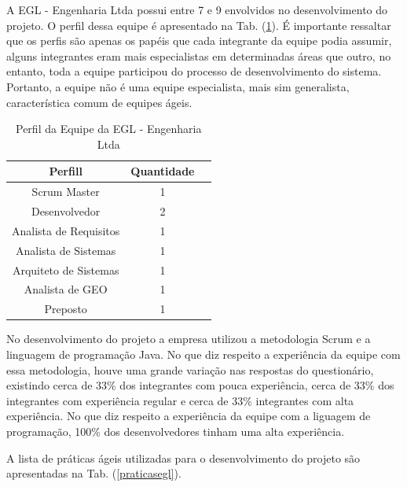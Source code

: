 A EGL - Engenharia Ltda possui entre 7 e 9 envolvidos no desenvolvimento do projeto.  O perfil dessa equipe é apresentado na Tab. (\ref{pegl}). É importante ressaltar que os perfis são apenas os papéis que cada integrante da equipe podia assumir, alguns integrantes eram mais especialistas em determinadas áreas que outro, no entanto, toda a equipe participou do processo de desenvolvimento do sistema. Portanto, a equipe não é uma equipe especialista, mais sim generalista, característica comum de equipes ágeis.

\begin{table}[H]
\center
\footnotesize
\begin{tabular}{|c|c|c|}
\hline
\textbf{Perfill}          & \textbf{Quantidade}  \\ \hline
Scrum Master               &  1                  \\ \hline
Desenvolvedor       &  2               \\ \hline
Analista de Requisitos              &   1                \\ \hline
Analista de Sistemas            &   1              \\ \hline
Arquiteto de Sistemas           &  1               \\ \hline
Analista de GEO              &  1               \\ \hline
Preposto   &  1               \\ \hline
\end{tabular}
\caption{Perfil da Equipe da EGL - Engenharia Ltda}
\label{pegl}
\end{table}


No desenvolvimento do projeto a empresa utilizou a metodologia Scrum e a linguagem de programação Java. No que diz respeito a experiência da equipe com essa metodologia, houve uma grande variação nas respostas do questionário, existindo cerca de 33\%  dos integrantes com pouca experiência, cerca de 33\% dos integrantes com experiência regular e cerca de 33\% integrantes com alta experiência. No que diz respeito a experiência da equipe com a liguagem de programação, 100\% dos desenvolvedores tinham uma alta experiência.

A lista de práticas ágeis utilizadas para o desenvolvimento do projeto são apresentadas na Tab. (\ref{praticasegl}).

